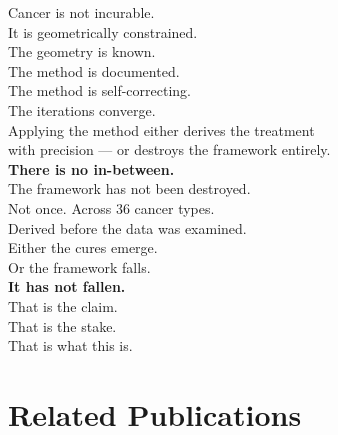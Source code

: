 \documentclass[11pt, a4paper]{article}
\begin{document}
\begin{mdframed}[backgroundcolor=claimbox,
                 linecolor=blue!60!black,
                 linewidth=1.5pt]
\begin{center}
\large
Cancer is not incurable.\\[0.3em]
It is geometrically constrained.\\[0.3em]
The geometry is known.\\[0.3em]
The method is documented.\\[0.3em]
The method is self-correcting.\\[0.3em]
The iterations converge.\\[0.6em]
Applying the method either derives the treatment\\
with precision --- or destroys the framework entirely.\\[0.6em]
\textbf{There is no in-between.}\\[0.6em]
The framework has not been destroyed.\\[0.3em]
Not once. Across 36 cancer types.\\[0.3em]
Derived before the data was examined.\\[0.6em]
Either the cures emerge.\\
Or the framework falls.\\[0.6em]
\textbf{It has not fallen.}\\[0.6em]
That is the claim.\\
That is the stake.\\
That is what this is.
\end{center}
\end{mdframed}

\section*{Related Publications}
\end{document}
